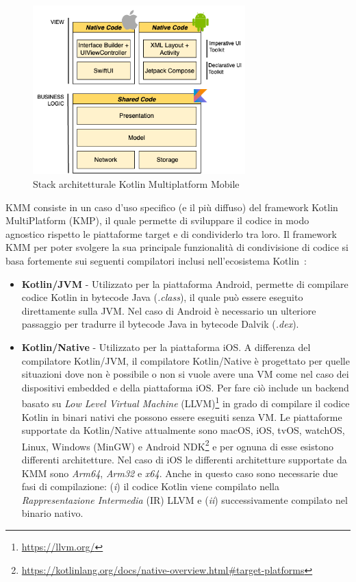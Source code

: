 \begin{figure}[H]
    \centering
    \includegraphics[width=0.73\textwidth]{img/stack_kmm.png}
    \caption{Stack architetturale Kotlin Multiplatform Mobile}
    \label{stackKMM}
\end{figure}

KMM consiste in un caso d'uso specifico (e il più diffuso) del framework Kotlin MultiPlatform (KMP), il quale permette di sviluppare il codice in modo agnostico rispetto le piattaforme target e di condividerlo tra loro. Il framework KMM per poter svolgere la sua principale funzionalità di condivisione di codice si basa fortemente sui seguenti compilatori inclusi nell'ecosistema Kotlin~\cite{nagy2022simplifying}:

\begin{itemize}
    \item \textbf{Kotlin/JVM} - Utilizzato per la piattaforma Android, permette di compilare codice Kotlin in bytecode Java (\textit{.class}), il quale può essere eseguito direttamente sulla JVM. Nel caso di Android è necessario un ulteriore passaggio per tradurre il bytecode Java in bytecode Dalvik (\textit{.dex}).

    \item \textbf{Kotlin/Native} - Utilizzato per la piattaforma iOS. A differenza del compilatore Kotlin/JVM, il compilatore Kotlin/Native è progettato per quelle situazioni dove non è possibile o non si vuole avere una VM come nel caso dei dispositivi embedded e della piattaforma iOS. Per fare ciò include un backend basato su \textit{Low Level Virtual Machine} (LLVM)\footnote{\href{https://llvm.org/}{https://llvm.org/}} in grado di compilare il codice Kotlin in binari nativi che possono essere eseguiti senza VM\cite{nagy2022simplifying}. Le piattaforme supportate da Kotlin/Native attualmente sono macOS, iOS, tvOS, watchOS, Linux, Windows (MinGW) e Android NDK\footnote{\href{https://kotlinlang.org/docs/native-overview.html\#target-platforms}{https://kotlinlang.org/docs/native-overview.html\#target-platforms}} e per ognuna di esse esistono differenti architetture. Nel caso di iOS le differenti architetture supportate da KMM sono \textit{Arm64}, \textit{Arm32} e \textit{x64}. Anche in questo caso sono necessarie due fasi di compilazione: (\textit{i}) il codice Kotlin viene compilato nella \textit{Rappresentazione Intermedia} (IR) LLVM e (\textit{ii}) successivamente compilato nel binario nativo.
\end{itemize}

